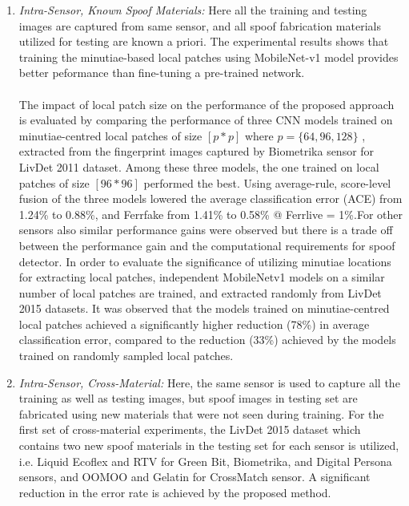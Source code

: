 \begin{enumerate}
\item \textit{Intra-Sensor, Known Spoof Materials:} 
 Here all the training and testing images are captured from same sensor, and all spoof fabrication materials utilized for testing are known a priori. The experimental results shows that training the minutiae-based local patches using MobileNet-v1 model provides better peformance than fine-tuning a pre-trained network.

 \paragraph{}
 The impact of local patch size on the performance of the proposed approach is evaluated by comparing the performance of three CNN models trained on minutiae-centred local patches of size $ [p\ast p]$ where $ p = \lbrace{64,96,128\rbrace}$ , extracted from the fingerprint images captured by Biometrika sensor for LivDet 2011 dataset. Among these three models, the one trained on local patches of size $ [96 \ast 96]$ performed the best. Using average-rule, score-level fusion of the three models lowered the average classification error (ACE) from 1.24\% to 0.88\%, and Ferrfake from 1.41\% to 0.58\% @ Ferrlive = 1\%.For other sensors also similar performance gains were observed  but there is a trade off between the performance gain and the computational requirements for spoof detector. In order to evaluate the significance of utilizing minutiae locations for extracting local patches, independent MobileNetv1 models on a similar number of local patches are trained, and extracted
randomly from LivDet 2015 datasets. It was observed that the models trained on minutiae-centred local patches achieved a significantly higher reduction (78\%) in average classification error, compared to the reduction (33\%) achieved by the models trained on randomly sampled local patches. 


\item \textit{Intra-Sensor, Cross-Material:}
Here, the same sensor is used to capture all the training as well as testing images, but spoof images in testing set are fabricated using new materials that were not seen during training. For the first set of cross-material experiments, the LivDet 2015 dataset which contains two new spoof materials in the testing set for each sensor is utilized, i.e. Liquid Ecoﬂex and RTV for Green Bit, Biometrika, and Digital Persona sensors, and OOMOO and Gelatin for CrossMatch sensor. A significant reduction in the error rate is achieved by the proposed method. 


\end{enumerate}
